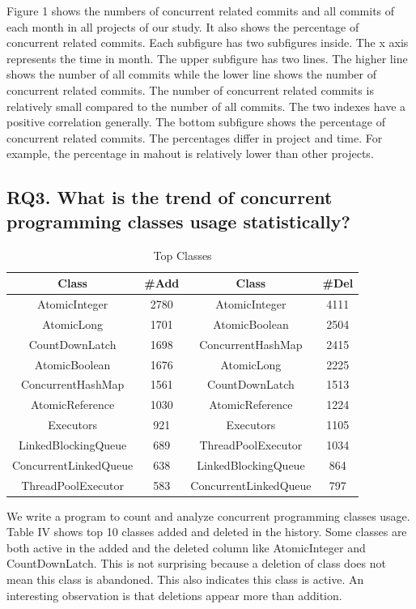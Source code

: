 \documentclass[conference]{IEEEtran}
\begin{document}
Figure 1 shows the numbers of concurrent related commits and all commits of each month in all projects of our study. It also shows the percentage of concurrent related commits. Each subfigure has two subfigures inside. The x axis represents the time in month. The upper subfigure has two lines. The higher line shows the number of all commits while the lower line shows the number of concurrent related commits. The number of concurrent related commits is relatively small compared to the number of all commits. The two indexes have a positive correlation generally. The bottom subfigure shows the percentage of concurrent related commits. The percentages differ in project and time. For example, the percentage in mahout is relatively lower than other projects.

\subsection{RQ3. What is the trend of concurrent programming classes usage statistically?}

\begin{table}
	\centering
	\caption{Top Classes}
	\begin{tabular}{|c|c||c|c|}\hline
		Class&\#Add&Class&\#Del\\\hline
		AtomicInteger&2780&AtomicInteger&4111\\\hline
		AtomicLong&1701&AtomicBoolean&2504\\\hline
		CountDownLatch&1698&ConcurrentHashMap&2415\\\hline
		AtomicBoolean&1676&AtomicLong&2225\\\hline
		ConcurrentHashMap&1561&CountDownLatch&1513\\\hline
		AtomicReference&1030&AtomicReference&1224\\\hline
		Executors&921&Executors&1105\\\hline
		LinkedBlockingQueue&689&ThreadPoolExecutor&1034\\\hline
		ConcurrentLinkedQueue&638&LinkedBlockingQueue&864\\\hline
		ThreadPoolExecutor&583&ConcurrentLinkedQueue&797\\\hline
	\end{tabular}
\end{table}

We write a program to count and analyze concurrent programming classes usage. Table IV shows top 10 classes added and deleted in the history. Some classes are both active in the added and the deleted column like AtomicInteger and CountDownLatch. This is not surprising because a deletion of class does not mean this class is abandoned. This also indicates this class is active. An interesting observation is that deletions appear more than addition.
\end{document}
